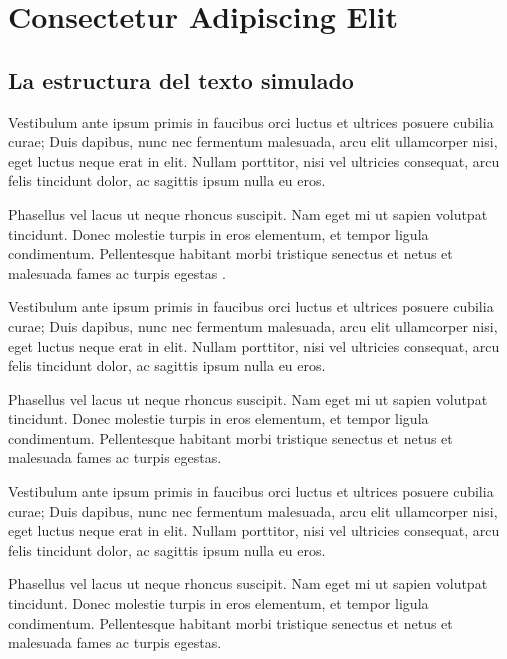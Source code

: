 \chapter{Consectetur Adipiscing Elit}
\setcounter{PrimPag}{\theCurrentPage}

\section{La estructura del texto simulado}

Vestibulum ante ipsum primis in faucibus orci luctus et ultrices posuere cubilia curae; Duis dapibus, nunc nec fermentum malesuada, arcu elit ullamcorper nisi, eget luctus neque erat in elit. Nullam porttitor, nisi vel ultricies consequat, arcu felis tincidunt dolor, ac sagittis ipsum nulla eu eros.

Phasellus vel lacus ut neque rhoncus suscipit. Nam eget mi ut sapien volutpat tincidunt. Donec molestie turpis in eros elementum, et tempor ligula condimentum. Pellentesque habitant morbi tristique senectus et netus et malesuada fames ac turpis egestas \parencite{@6592-ALAIN2017}.

Vestibulum ante ipsum primis in faucibus orci luctus et ultrices posuere cubilia curae; Duis dapibus, nunc nec fermentum malesuada, arcu elit ullamcorper nisi, eget luctus neque erat in elit. Nullam porttitor, nisi vel ultricies consequat, arcu felis tincidunt dolor, ac sagittis ipsum nulla eu eros.

Phasellus vel lacus ut neque rhoncus suscipit. Nam eget mi ut sapien volutpat tincidunt. Donec molestie turpis in eros elementum, et tempor ligula condimentum. Pellentesque habitant morbi tristique senectus et netus et malesuada fames ac turpis egestas.

Vestibulum ante ipsum primis in faucibus orci luctus et ultrices posuere cubilia curae; Duis dapibus, nunc nec fermentum malesuada, arcu elit ullamcorper nisi, eget luctus neque erat in elit. Nullam porttitor, nisi vel ultricies consequat, arcu felis tincidunt dolor, ac sagittis ipsum nulla eu eros.

Phasellus vel lacus ut neque rhoncus suscipit. Nam eget mi ut sapien volutpat tincidunt. Donec molestie turpis in eros elementum, et tempor ligula condimentum. Pellentesque habitant morbi tristique senectus et netus et malesuada fames ac turpis egestas.


